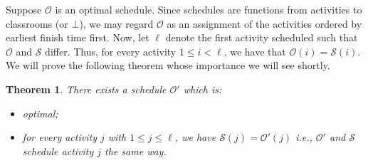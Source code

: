 \documentclass{article}
\theoremstyle{plain}%
\newtheorem{thm}{Theorem}[section]
\theoremstyle{definition}
\theoremstyle{remark}
\begin{document}
Suppose $\mathcal{O}$ is an optimal schedule. 
Since schedules are functions from activities to classrooms (or $\bot$),
    we may regard $\mathcal{O}$ as an assignment of the activities
    ordered by earliest finish time first.
Now, let $\ell$ denote the first activity scheduled such that $\mathcal{O}$ and
    $\mathcal{S}$ differ. 
Thus, for every activity $1 \le i < \ell$, we have that $\mathcal{O}(i) = \mathcal{S}(i)$.
We will prove the following theorem whose importance we will see shortly.
\begin{thm}
    There exists a schedule $\mathcal{O}'$ which is: 
    \begin{itemize}
        \item optimal;
        \item for every activity $j$ with $1 \le j \le \ell$, 
                we have $\mathcal{S}(j) = \mathcal{O}'(j)$ i.e.,
                    $\mathcal{O}'$ and $\mathcal{S}$ schedule activity $j$ the same
                way.
    \end{itemize}
\end{thm}
\end{document}
